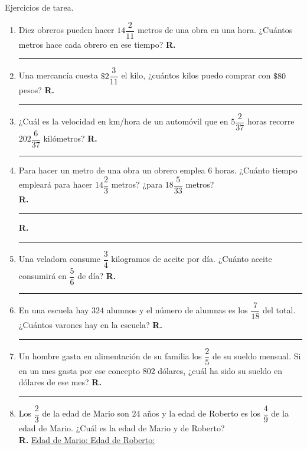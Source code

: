 \newpage

Ejercicios de tarea.

\begin{enumerate}
\item Diez obreros pueden hacer $14 \dfrac{2}{11}$ metros de una obra en una hora. \break \hfill ¿Cuántos metros hace cada obrero en ese tiempo? \hspace{0.3cm} \textbf{R.} \rule{3cm}{0.1mm}
\item Una mercancía cuesta $\$ 2 \dfrac{3}{11}$ el kilo, ¿cuántos kilos puedo comprar con $\$ 80$ pesos? \hspace{0.3cm} \textbf{R.} \rule{3cm}{0.1mm}
\item ¿Cuál es la velocidad en km/hora de un automóvil que en $5 \dfrac{2}{37}$ horas recorre $202 \dfrac{6}{37}$ kilómetros? \hspace{0.3cm} \textbf{R.} \rule{3cm}{0.1mm}
\item Para hacer un metro de una obra un obrero emplea $6$ horas. ¿Cuánto tiempo empleará para hacer $14 \dfrac{2}{3}$ metros? ¿para $18 \dfrac{5}{33}$ metros?
\\
\textbf{R.} \rule{3cm}{0.1mm} \hspace{0.2cm} \hspace{0.3cm} \textbf{R.} \rule{3cm}{0.1mm}
\item Una veladora consume $\dfrac{3}{4}$ kilogramos de aceite por día. ¿Cuánto aceite consumirá en $\dfrac{5}{6}$ de día? \hspace{0.3cm} \textbf{R.} \rule{3cm}{0.1mm}
\item En una escuela hay $324$ alumnos y el número de alumnas es los $\dfrac{7}{18}$ del total. ¿Cuántos varones hay en la escuela? \hspace{0.3cm} \textbf{R.} \rule{3cm}{0.1mm}
\item Un hombre gasta en alimentación de su familia los $\dfrac{2}{5}$ de su sueldo mensual. Si en un mes gasta por ese concepto $802$ dólares, ¿cuál ha sido su sueldo en dólares de ese mes? \hspace{0.3cm} \textbf{R.} \rule{3cm}{0.1mm}
\item Los $\dfrac{2}{3}$ de la edad de Mario son $24$ años y la edad de Roberto es los $\dfrac{4}{9}$ de la edad de Mario. ¿Cuál es la edad de Mario y de Roberto? 
\\ 
\textbf{R.} \underline{Edad de Mario: \hspace{3cm} Edad de Roberto: \hspace{2cm}}
\end{enumerate}
